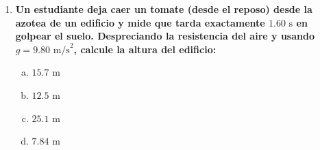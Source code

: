 \documentclass[11pt,a4paper]{article}
\begin{document}
\begin{enumerate}
    \item \textbf{Un estudiante deja caer un tomate (desde el reposo) desde la azotea de un edificio y mide que tarda exactamente $1.60 \text{ s}$ en golpear el suelo. Despreciando la resistencia del aire y usando $g = 9.80 \text{ m/s}^2$, calcule la altura del edificio:}
    \begin{enumerate}[a)]
        \item $15.7 \text{ m}$
        \item $12.5 \text{ m}$
        \item $25.1 \text{ m}$
        \item $7.84 \text{ m}$
    \end{enumerate}

\end{enumerate}
\end{document}
